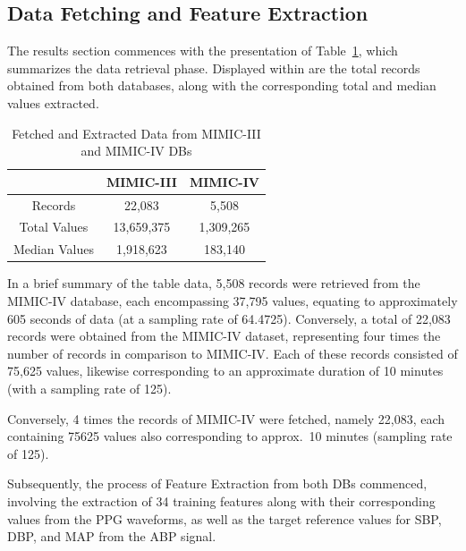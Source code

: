\subsection{Data Fetching and Feature Extraction}
\label{subsec:results_data}

The results section commences with the presentation of Table~\ref{tab:records}, which summarizes the data retrieval phase.
Displayed within are the total records obtained from both databases, along with the corresponding total and median values extracted.

\begin{table}
    \renewcommand{\arraystretch}{1.5}
    \setlength{\tabcolsep}{12pt}
    \begin{center}
        \begin{tabular}{ |c|c|c| }
            \hline
            & MIMIC-III  & MIMIC-IV  \\
            \hline
            Records       & 22,083     & 5,508     \\
            \hline
            Total Values  & 13,659,375 & 1,309,265 \\
            \hline
            Median Values & 1,918,623  & 183,140   \\
            \hline
        \end{tabular}
    \end{center}
    \captionsetup{format=plain, justification=centering}
    \caption{Fetched and Extracted Data from MIMIC-III and MIMIC-IV DBs}
    \label{tab:records}
\end{table}

In a brief summary of the table data, 5,508 records were retrieved from the MIMIC-IV database, each encompassing 37,795 values, equating to approximately 605 seconds of data (at a sampling rate of 64.4725).
Conversely, a total of 22,083 records were obtained from the MIMIC-IV dataset, representing four times the number of records in comparison to MIMIC-IV\@.
Each of these records consisted of 75,625 values, likewise corresponding to an approximate duration of 10 minutes (with a sampling rate of 125).

Conversely, 4 times the records of MIMIC-IV were fetched, namely 22,083, each containing 75625 values also corresponding to approx.\ 10 minutes (sampling rate of 125).

Subsequently, the process of Feature Extraction from both DBs commenced, involving the extraction of 34 training features along with their corresponding values from the PPG waveforms,
as well as the target reference values for SBP, DBP, and MAP from the ABP signal.

